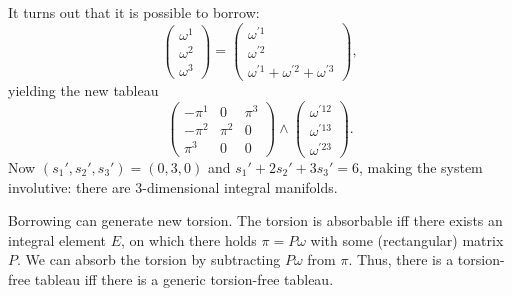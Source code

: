 \begin{example}[Borrowing]
    It turns out that it is possible to borrow:
    \[\begin{pmatrix}
        \omega^1\\\omega^2\\\omega^3
    \end{pmatrix}=
    \begin{pmatrix}
        \omega^{\prime 1}\\
        \omega^{\prime 2}\\
        \omega^{\prime 1}+\omega^{\prime 2}+ \omega^{\prime 3}
    \end{pmatrix},
    \]
    yielding the new tableau 
    \[
        \left(\begin{array}{|c|cc}
            \boxed{-\pi^1} & 0 & \pi^3\\
            \boxed{-\pi^2} & \pi^2 & 0\\
            \boxed{\pi^3} & 0 & 0
        \end{array}\right)\wedge 
        \left(\begin{array}{c}
            \hline \omega^{\prime 12}\\
            \hline \omega^{\prime 13}\\
            \omega^{\prime 23}
        \end{array}\right).
    \]    
    Now $(s_1',s_2',s_3')=(0,3,0)$ and $s_1'+2s_2'+3s_3'=6$, making the system involutive: there are $3$-dimensional integral manifolds.
\end{example}


Borrowing can generate new torsion. The torsion is absorbable iff there exists an integral element $E$, on which there holds $\pi=P\omega$ with some (rectangular) matrix $P$. We can absorb the torsion by subtracting $P\omega$ from $\pi$. Thus, there is a torsion-free tableau iff there is a generic torsion-free tableau.


